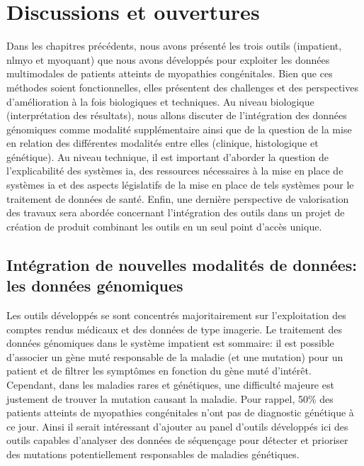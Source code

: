 \chapter{Discussions et ouvertures}
Dans les chapitres précédents, nous avons présenté les trois outils (\gls{impatient}, \gls{nlmyo} et \gls{myoquant}) que nous avons développés pour exploiter les données multimodales de patients atteints de myopathies congénitales. Bien que ces méthodes soient fonctionnelles, elles présentent des challenges et des perspectives d'amélioration à la fois biologiques et techniques. Au niveau biologique (interprétation des résultats), nous allons discuter de l'intégration des données génomiques comme modalité supplémentaire ainsi que de la question de la mise en relation des différentes modalités entre elles (clinique, histologique et génétique). Au niveau technique, il est important d'aborder la question de l'explicabilité des systèmes \gls{ia}, des ressources nécessaires à la mise en place de systèmes \gls{ia} et des aspects législatifs de la mise en place de tels systèmes pour le traitement de données de santé. Enfin, une dernière perspective de valorisation des travaux sera abordée concernant l'intégration des outils dans un projet de création de produit combinant les outils en un seul point d'accès unique.

\section{Intégration de nouvelles modalités de données: les données génomiques}
Les outils développés se sont concentrés majoritairement sur l'exploitation des comptes rendus médicaux et des données de type imagerie. Le traitement des données génomiques dans le système \gls{impatient} est sommaire: il est possible d'associer un gène muté responsable de la maladie (et une mutation) pour un patient et de filtrer les symptômes en fonction du gène muté d'intérêt. Cependant, dans les maladies rares et génétiques, une difficulté majeure est justement de trouver la mutation causant la maladie. Pour rappel, 50\% des patients atteints de myopathies congénitales n'ont pas de diagnostic génétique à ce jour. Ainsi il serait intéressant d'ajouter au panel d'outils développés ici des outils capables d'analyser des données de séquençage pour détecter et prioriser des mutations potentiellement responsables de maladies génétiques. 

